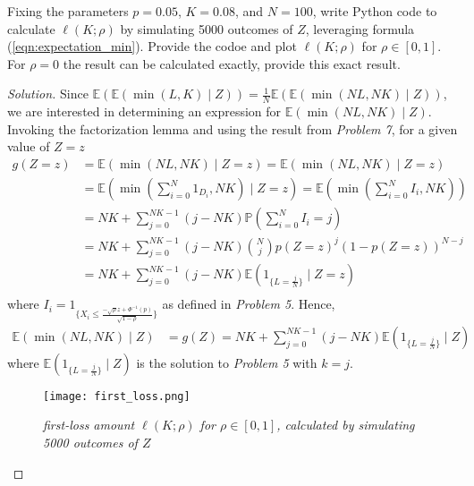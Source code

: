 \documentclass[10pt]{article}
\newcommand{\E}{\mathbb{E}}
\newenvironment{problem}[2][Problem]{\begin{trivlist}
\item[\hskip \labelsep {\bfseries #1}\hskip \labelsep {\bfseries #2.}]}{\end{trivlist}}
\begin{document}
\begin{problem}{8}
    Fixing the parameters $p = 0.05$, $K = 0.08$, and $N = 100$, write Python code to calculate $\ell(K; \rho)$ by simulating 5000 outcomes of $Z$, leveraging formula (\ref{eqn:expectation_min}).
    Provide the codoe and plot $\ell(K; \rho)$ for $\rho \in [0,1]$.
    For $\rho = 0$ the result can be calculated exactly, provide this exact result.
\end{problem}

\begin{proof}[Solution]
    Since $\E(\E(\min(L, K) \mid Z)) = \frac{1}{N} \E(\E(\min(NL, NK) \mid Z))$, we are interested in determining an expression for $\E(\min(NL, NK) \mid Z)$.
    Invoking the factorization lemma and using the result from \textit{Problem 7}, for a given value of $Z = z$
    \begin{align*}
        g(Z = z) &= \E(\min(NL, NK) \mid Z = z) = \E(\min(NL, NK) \mid Z = z) \\
        &= \E \left( \min \left(\sum_{i=0}^N 1_{D_i}, NK \right) \mid Z = z \right) = \E \left( \min \left(\sum_{i=0}^N I_i, NK \right) \right) \\
        &= NK + \sum_{j=0}^{NK-1} (j-NK) \mathbb{P}\left( \sum_{i=0}^N I_i = j \right) \\
        &= NK + \sum_{j=0}^{NK-1} (j-NK) \binom{N}{j} p(Z = z)^j \left( 1 - p(Z = z) \right)^{N-j} \\
        &= NK + \sum_{j=0}^{NK-1} (j-NK) \E \left( 1_{\{L = \frac{j}{N}\}} \mid Z = z \right) \\
    \end{align*}
    where $I_i = 1_{\{ X_i \leq \frac{-\sqrt{\rho} z + \Phi^{-1}(p)}{\sqrt{1 - \rho}} \}}$ as defined in \textit{Problem 5}. Hence,
    \begin{align*}
        \E(\min(NL, NK) \mid Z) &= g(Z) = NK + \sum_{j=0}^{NK-1} (j-NK) \E \left( 1_{\{L = \frac{j}{N}\}} \mid Z \right)
    \end{align*}
    where $\E \left( 1_{\{L = \frac{j}{N}\}} \mid Z \right)$ is the solution to \textit{Problem 5} with $k = j$. 
    
    \begin{figure}[H]
        \begin{center}
            \texttt{[image: first\_loss.png]}
            \caption{\textit{first-loss amount $\ell(K;\rho)$ for $\rho \in [0, 1]$, calculated by simulating 5000 outcomes of $Z$}}
            \label{fig:first_loss}
        \end{center}
    \end{figure}
    

\end{proof}
\end{document}
